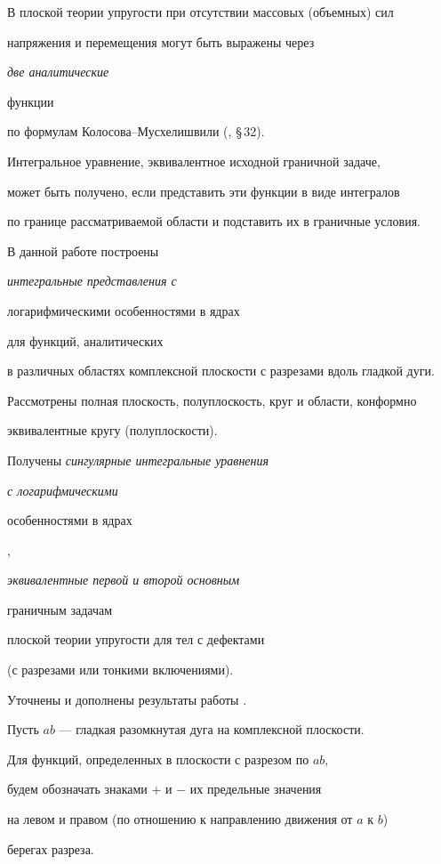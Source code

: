 \label{begin}








В плоской теории упругости при отсутствии массовых (объемных) сил


напряжения и перемещения могут быть выражены через {\it две аналитические


функции} по формулам Колосова--Мусхелишвили (\cite{Mush.MTU}, \S\,32).


Интегральное уравнение, эквивалентное исходной граничной задаче,


может быть получено, если представить эти функции в виде интегралов


по границе рассматриваемой области и подставить их в граничные условия.





В данной работе построены {\it интегральные представления с


логарифмическими особенностями в ядрах} для функций, аналитических


в различных областях комплексной плоскости с разрезами вдоль гладкой дуги.


Рассмотрены полная плоскость, полуплоскость, круг и области, конформно


эквивалентные кругу (полуплоскости).


Получены {\it сингулярные интегральные уравнения} {\it с логарифмическими


особенностями в ядрах}, {\it эквивалентные первой и второй основным


граничным задачам} плоской теории упругости для тел с дефектами


(с разрезами или тонкими включениями).


Уточнены и дополнены результаты работы \cite{PNB.Pre}.





Пусть $ab$ --- гладкая разомкнутая дуга на комплексной плоскости.


Для функций, определенных в плоскости с разрезом по $ab$,


будем обозначать знаками $+$ и $-$ их предельные значения


на левом и правом (по отношению к направлению движения от $a$ к $b$)


берегах разреза.





